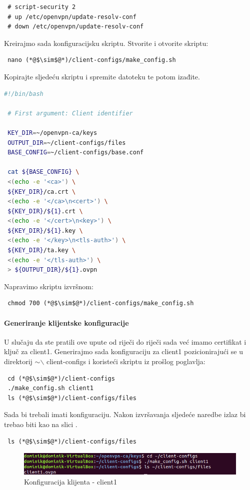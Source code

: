 \begin{lstlisting}
 # script-security 2
 # up /etc/openvpn/update-resolv-conf
 # down /etc/openvpn/update-resolv-conf
\end{lstlisting}
Kreirajmo sada konfiguracijsku skriptu. Stvorite i otvorite skriptu:
\begin{lstlisting}
 nano (*@$\sim$@*)/client-configs/make_config.sh
\end{lstlisting}
Kopirajte sljedeću skriptu i spremite datoteku te potom izađite.
\begin{lstlisting}[language=bash]
 #!/bin/bash
 
 # First argument: Client identifier
 
 KEY_DIR=~/openvpn-ca/keys
 OUTPUT_DIR=~/client-configs/files
 BASE_CONFIG=~/client-configs/base.conf
 
 cat ${BASE_CONFIG} \
 <(echo -e '<ca>') \
 ${KEY_DIR}/ca.crt \
 <(echo -e '</ca>\n<cert>') \
 ${KEY_DIR}/${1}.crt \
 <(echo -e '</cert>\n<key>') \
 ${KEY_DIR}/${1}.key \
 <(echo -e '</key>\n<tls-auth>') \
 ${KEY_DIR}/ta.key \
 <(echo -e '</tls-auth>') \
 > ${OUTPUT_DIR}/${1}.ovpn
\end{lstlisting}
Napravimo skriptu izvršnom:
\begin{lstlisting}
 chmod 700 (*@$\sim$@*)/client-configs/make_config.sh
\end{lstlisting}
\bigbreak
\paragraph*{Generiranje klijentske konfiguracije}
\hfill \smallbreak
U slučaju da ste pratili ove upute od riječi do riječi sada već imamo certifikat i ključ za client1. Generirajmo sada konfiguraciju za client1 pozicionirajući se u direktorij $\sim$$\backslash$ client-configs i koristeći skriptu iz prošlog poglavlja:
\begin{lstlisting}
 cd (*@$\sim$@*)/client-configs
 ./make_config.sh client1
 ls (*@$\sim$@*)/client-configs/files
\end{lstlisting}
Sada bi trebali imati konfiguraciju. Nakon izvršavanja sljedeće naredbe izlaz bi trebao biti kao na slici .
\begin{lstlisting}
 ls (*@$\sim$@*)/client-configs/files
\end{lstlisting}
\begin{figure}[h]
	\centering
	\includegraphics[width=0.7\linewidth]{"slike/OpenVPN/Screenshot from 2018-12-14 19-29-50"}
	\caption[Konfiguracija klijenta - client1]{Konfiguracija klijenta - client1}
	\label{fig:screenshot-from-2018-12-14-19-29-50}
\end{figure}


